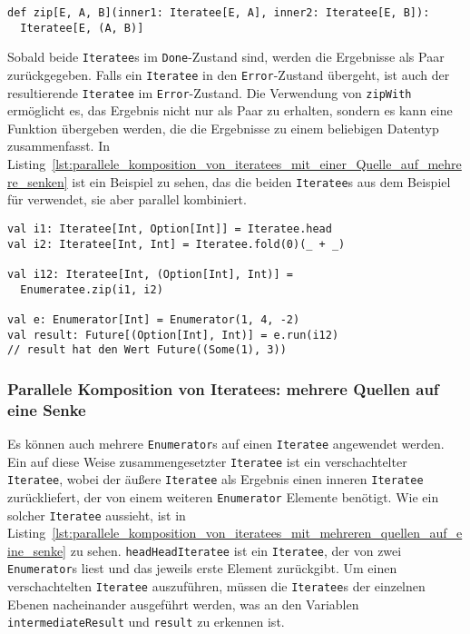 \begin{lstlisting}[caption=Die Signatur von Enumeratee.zip, label=lst:signatur_enumeratee_zip]
def zip[E, A, B](inner1: Iteratee[E, A], inner2: Iteratee[E, B]):
  Iteratee[E, (A, B)]
\end{lstlisting}

Sobald beide \lstinline|Iteratee|s im \lstinline|Done|-Zustand sind, werden die Ergebnisse als Paar zurückgegeben.
Falls ein \lstinline|Iteratee| in den \lstinline|Error|-Zustand übergeht, ist auch der resultierende \lstinline|Iteratee| im \lstinline|Error|-Zustand.
Die Verwendung von \lstinline|zipWith| ermöglicht es, das Ergebnis nicht nur als Paar zu erhalten, sondern es kann eine Funktion übergeben werden, die die Ergebnisse zu einem beliebigen Datentyp zusammenfasst.
In Listing~\ref{lst:parallele_komposition_von_iteratees_mit_einer_Quelle_auf_mehrere_senken} ist ein Beispiel zu sehen, das die beiden \lstinline|Iteratee|s aus dem Beispiel für  verwendet, sie aber parallel kombiniert.

\begin{lstlisting}[caption=Parallele Komposition von Iteratees mit einer Quelle und mehreren Senken, label=lst:parallele_komposition_von_iteratees_mit_einer_Quelle_auf_mehrere_senken]
val i1: Iteratee[Int, Option[Int]] = Iteratee.head
val i2: Iteratee[Int, Int] = Iteratee.fold(0)(_ + _)

val i12: Iteratee[Int, (Option[Int], Int)] =
  Enumeratee.zip(i1, i2)

val e: Enumerator[Int] = Enumerator(1, 4, -2)
val result: Future[(Option[Int], Int)] = e.run(i12)
// result hat den Wert Future((Some(1), 3))
\end{lstlisting}


\subsubsection{Parallele Komposition von Iteratees: mehrere Quellen auf eine Senke} %
\label{ssub:anwendung_parallele_komposition_von_iteratees_mehrere_quellen}

Es können auch mehrere \lstinline|Enumerator|s auf einen \lstinline|Iteratee| angewendet werden.
Ein auf diese Weise zusammengesetzter \lstinline|Iteratee| ist ein verschachtelter \lstinline|Iteratee|, wobei der äußere \lstinline|Iteratee| als Ergebnis einen inneren \lstinline|Iteratee| zurückliefert, der von einem weiteren \lstinline|Enumerator| Elemente benötigt.
Wie ein solcher \lstinline|Iteratee| aussieht, ist in Listing~\ref{lst:parallele_komposition_von_iteratees_mit_mehreren_quellen_auf_eine_senke} zu sehen.
\lstinline|headHeadIteratee| ist ein \lstinline|Iteratee|, der von zwei \lstinline|Enumerator|s liest und das jeweils erste Element zurückgibt.
Um einen verschachtelten \lstinline|Iteratee| auszuführen, müssen die \lstinline|Iteratee|s der einzelnen Ebenen nacheinander ausgeführt werden, was an den Variablen \lstinline|intermediateResult| und \lstinline|result| zu erkennen ist.

